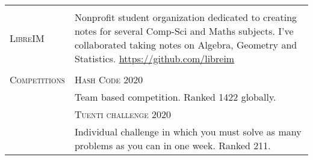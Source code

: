 \documentclass[a4paper,10pt]{article} %
\begin{document}
\begin{tabular}{p{3cm}|p{11cm}}
  \multicolumn{2}{c}{}                                                                                                                                                                                                                                                                \\
  \textsc{LibreIM}                    &
                                          \footnotesize Nonprofit student organization dedicated to creating notes for several Comp-Sci and Maths subjects. I've collaborated taking notes on Algebra, Geometry and Statistics.
  \url{https://github.com/libreim}                                                                                                                                                                                                        \\

  \multicolumn{2}{c}{}                                                                                                                                                                                                                                                                \\
  \textsc{Competitions}                  & \textsc{Hash Code 2020}                                                                                                                                                                                                                    \\
                                         & \footnotesize Team based competition. Ranked 1422 globally.                                                                                                                                                                             \\
                                         & \textsc{Tuenti challenge 2020}                                                                                                                                                                                                             \\
                                         & \footnotesize Individual challenge in which you must solve as many problems as you can in one week. Ranked 211.
\end{tabular}\\






\end{document}
